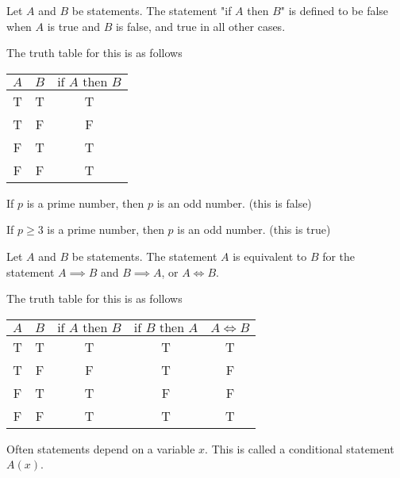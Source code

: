 \documentclass[10pt, a4paper]{article}
\begin{document}
\begin{definition}
    Let $A$ and $B$ be statements. The statement "if $A$ then $B$" is defined to be false when $A$ is true and $B$ is false, and true in all other cases.

    The truth table for this is as follows
    \begin{table}[H]
        \centering
        \begin{tabular}{|c|c|c|}
            \hline
            $A$ & $B$ & $\text{if } A \text{ then } B$ \\
            \hline
            T & T & T \\
            T & F & F \\
            F & T & T \\
            F & F & T \\
            \hline
        \end{tabular}
        \label{tab:Gr7}
    \end{table}
\end{definition}
\begin{example}
    If $p$ is a prime number, then $p$ is an odd number. (this is false)

    If $p \geq 3$ is a prime number, then $p$ is an odd number. (this is true)
\end{example}

\begin{definition}
    Let $A$ and $B$ be statements. The statement $A$ is equivalent to $B$ for the statement $A \implies B$ and $B \implies A$, or $A \iff B$.
    
    The truth table for this is as follows
    \begin{table}[H]
        \centering
        \begin{tabular}{|c|c|c|c|c|}
            \hline
            $A$ & $B$ & $\text{if } A \text{ then } B$ & $\text{if } B \text{ then } A$ & $A \iff B$ \\
            \hline
            T & T & T & T & T \\
            T & F & F & T & F \\
            F & T & T & F & F \\
            F & F & T & T & T \\
            \hline
        \end{tabular}
        \label{tab:Gr8}
    \end{table}
\end{definition}

Often statements depend on a variable $x$. This is called a conditional statement $A(x)$.
\end{document}
